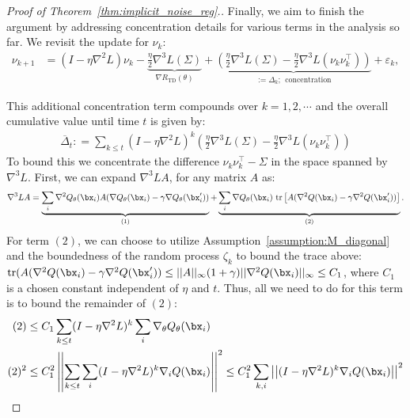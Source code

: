 \begin{proof}[Proof of Theorem~\ref{thm:implicit_noise_reg}.]
Finally, we aim to finish the argument by addressing concentration details for various terms in the analysis so far. We revisit the update for $\nu_k$:
\begin{align}
    \nu_{k+1} &= (I - \eta \nabla^2 L) \nu_k - \underbrace{\frac{\eta}{2} \nabla^3 L (\Sigma)}_{\nabla R_\mathrm{TD}(\theta)} + \underbrace{\left( \frac{\eta}{2} \nabla^3 L (\Sigma) - \frac{\eta}{2} \nabla^3 L (\nu_k \nu_k^\top) \right)}_{:= \Delta_k; ~~\text{concentration}} + \varepsilon_k,
\end{align}

This additional concentration term compounds over $k=1, 2, \cdots$ and the overall cumulative value until time $t$ is given by:
\begin{align}
\label{eqn:delta_eqn}
    \overline{\Delta}_t: = \sum_{k \leq t} (I - \eta \nabla^2 L)^k \left( \frac{\eta}{2} \nabla^3 L (\Sigma) - \frac{\eta}{2} \nabla^3 L (\nu_k \nu_k^\top) \right)
\end{align}
To bound this we concentrate the difference $\nu_k \nu_k^\top - \Sigma$ in the space spanned by $\nabla^3 L$. First, we can expand $\nabla^3 L A$, for any matrix $A$ as:
\begin{equation}
    \nabla^3 L A = \underbrace{\sum_i \nabla^2 Q_\theta(\bx_i) A (\nabla Q_\theta(\bx_i) - \gamma \nabla Q_\theta(\bx'_i))}_{(1)} + \underbrace{\sum_i \nabla Q_\theta(\bx_i)~ \text{tr}\left[ A (\nabla^2 Q(\bx_i) - \gamma \nabla^2 Q(\bx'_i)) \right]}_{(2)}. 
\end{equation}
For term $(2)$, we can choose to utilize Assumption~\ref{assumption:M_diagonal} and the boundedness of the random process $\zeta_k$ to bound the trace above: $\text{tr}(A (\nabla^2 Q(\bx_i) - \gamma \nabla^2 Q(\bx'_i)) \leq ||A||_\infty (1 + \gamma) ||\nabla^2 Q(\bx_i)||_\infty \leq C_1$, where $C_1$ is a chosen constant independent of $\eta$ and $t$. Thus, all we need to do for this term is to bound the remainder of $(2)$:
\begin{align*}
    (2) &\leq C_1 \sum_{k \leq t} (I - \eta \nabla^2 L)^k \sum_i \nabla_\theta Q_\theta(\bx_i)\\
    (2)^2 &\leq C_1^2 \left\vert \left\vert \sum_{k \leq t} \sum_i (I - \eta \nabla^2 L)^k \nabla_i Q(\bx_i) \right\vert \right\vert^2 \leq C_1^2 \sum_{k, i} \left\vert \left\vert (I - \eta \nabla^2 L)^{k} \nabla_i Q(\bx_i) \right\vert\right\vert^2\\

\end{align*}
\end{proof}

